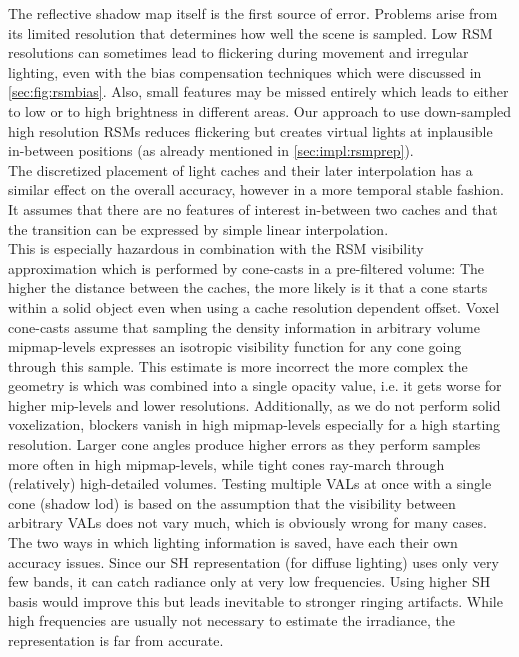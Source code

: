 \documentclass[thesis.tex]{subfiles}
\begin{document}
The reflective shadow map itself is the first source of error.
Problems arise from its limited resolution that determines how well the scene is sampled.
Low RSM resolutions can sometimes lead to flickering during movement and irregular lighting, even with the bias compensation techniques which were discussed in \autoref{sec:fig:rsmbias}.
Also, small features may be missed entirely which leads to either to low or to high brightness in different areas.
Our approach to use down-sampled high resolution RSMs reduces flickering but creates virtual lights at inplausible in-between positions (as already mentioned in \autoref{sec:impl:rsmprep}).
\\
The discretized placement of light caches and their later interpolation has a similar effect on the overall accuracy, however in a more temporal stable fashion.
It assumes that there are no features of interest in-between two caches and that the transition can be expressed by simple linear interpolation.
\\
This is especially hazardous in combination with the RSM visibility approximation which is performed by cone-casts in a pre-filtered volume:
The higher the distance between the caches, the more likely is it that a cone starts within a solid object even when using a cache resolution dependent offset.
Voxel cone-casts assume that sampling the density information in arbitrary volume mipmap-levels expresses an isotropic visibility function for any cone going through this sample.
This estimate is more incorrect the more complex the geometry is which was combined into a single opacity value, i.e. it gets worse for higher mip-levels and lower resolutions.
Additionally, as we do not perform solid voxelization, blockers vanish in high mipmap-levels especially for a high starting resolution.
Larger cone angles produce higher errors as they perform samples more often in high mipmap-levels, while tight cones ray-march through (relatively) high-detailed volumes.
Testing multiple VALs at once with a single cone (shadow lod) is based on the assumption that the visibility between arbitrary VALs does not vary much, which is obviously wrong for many cases.
\\
The two ways in which lighting information is saved, have each their own accuracy issues.
Since our SH representation (for diffuse lighting) uses only very few bands, it can catch radiance only at very low frequencies.
Using higher SH basis would improve this but leads inevitable to stronger ringing artifacts.
While high frequencies are usually not necessary to estimate the irradiance, the representation is far from accurate. 
\end{document}
